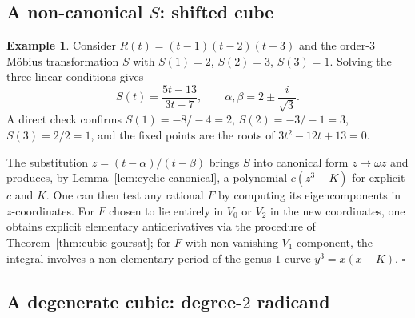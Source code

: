 \documentclass[11pt,a4paper]{article}
\theoremstyle{plain}
\theoremstyle{definition}
\newtheorem{example}[theorem]{Example}
\theoremstyle{remark}
\begin{document}
\subsection{A non-canonical $S$: shifted cube}

\begin{example}\label{ex:non-canonical-S}
Consider $R(t)=(t-1)(t-2)(t-3)$ and the order-$3$ M\"obius transformation $S$ with $S(1)=2$, $S(2)=3$, $S(3)=1$. Solving the three linear conditions gives
\[
  S(t) = \frac{5t-13}{3t-7}, \qquad \alpha,\beta = 2 \pm \frac{i}{\sqrt 3}.
\]
A direct check confirms $S(1)=-8/-4=2$, $S(2)=-3/-1=3$, $S(3)=2/2=1$, and the fixed points are the roots of $3t^2-12t+13=0$.

The substitution $z=(t-\alpha)/(t-\beta)$ brings $S$ into canonical form $z\mapsto\omega z$ and produces, by Lemma~\ref{lem:cyclic-canonical}, a polynomial $c(z^3-K)$ for explicit $c$ and $K$. One can then test any rational $F$ by computing its eigencomponents in $z$-coordinates. For $F$ chosen to lie entirely in $V_0$ or $V_2$ in the new coordinates, one obtains explicit elementary antiderivatives via the procedure of Theorem~\ref{thm:cubic-goursat}; for $F$ with non-vanishing $V_1$-component, the integral involves a non-elementary period of the genus-$1$ curve $y^3 = x(x-K)$.
\hfill$\square$
\end{example}

\subsection{A degenerate cubic: degree-$2$ radicand}\label{ex:cubic-degree-2}
\end{document}
